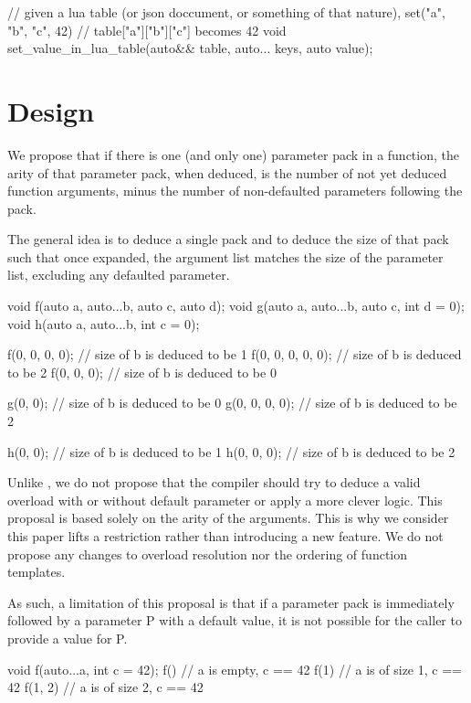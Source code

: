 \documentclass{wg21}
\begin{document}
\begin{colorblock}
// given a lua table (or json doccument, or something of that nature), set("a", "b", "c", 42)
// table["a"]["b"]["c"] becomes 42
void set_value_in_lua_table(auto&& table, auto... keys, auto value);
\end{colorblock}


\section{Design}

We propose that if there is one (and only one) parameter pack in a function,
the arity of that parameter pack, when deduced, is the number of not yet deduced function arguments, minus the number of non-defaulted
parameters following the pack.

The general idea is to deduce a single pack and to deduce the size of that pack such that once expanded,
the argument list matches the size of the parameter list, excluding any defaulted parameter.

\begin{colorblock}
void f(auto a, auto...b, auto c, auto d);
void g(auto a, auto...b, auto c, int d = 0);
void h(auto a, auto...b, int c = 0);


f(0, 0, 0, 0);      // size of b is deduced to be 1
f(0, 0, 0, 0, 0);   // size of b is deduced to be 2
f(0, 0, 0);         // size of b is deduced to be 0

g(0, 0);           // size of b is deduced to be 0
g(0, 0, 0, 0);     // size of b is deduced to be 2

h(0, 0);           // size of b is deduced to be 1
h(0, 0, 0);        // size of b is deduced to be 2

\end{colorblock}

Unlike , we do not propose that the compiler should try to deduce a valid overload with or without default parameter or apply
a more clever logic.
This proposal is based solely on the arity of the arguments.
This is why we consider this paper lifts a restriction rather than introducing a new feature.
We do not propose any changes to overload resolution nor the ordering of function templates.

As such, a limitation of this proposal is that if a parameter pack is immediately followed by a parameter P with a default value,
it is not possible for the caller to provide a value for P.

\begin{colorblock}
void f(auto...a, int c = 42);
f()     // a is empty, c == 42
f(1)    // a is of size 1,  c == 42
f(1, 2) // a is of size 2,  c == 42

\end{colorblock}
\end{document}
